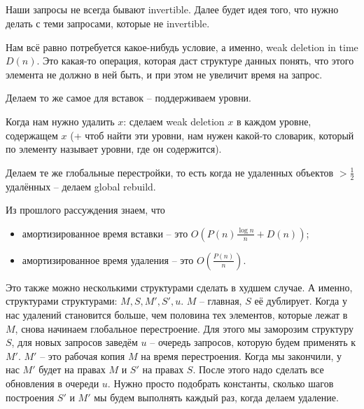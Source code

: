 \subsection{}

Наши запросы не всегда бывают invertible. Далее будет идея того, что нужно делать с теми запросами, которые не invertible.

Нам всё равно потребуется какое-нибудь условие, а именно, weak deletion in time $D(n)$. Это какая-то операция, которая даст структуре данных понять, что этого элемента не должно в ней быть, и при этом не увеличит время на запрос.

Делаем то же самое для вставок -- поддерживаем уровни.

Когда нам нужно удалить $x$: сделаем weak deletion $x$ в каждом уровне, содержащем $x$ (+ чтоб найти эти уровни, нам нужен какой-то словарик, который по элементу называет уровни, где он содержится).

Делаем те же глобальные перестройки, то есть когда не удаленных объектов $>\frac{1}{2}$ удалённых -- делаем global rebuild.

Из прошлого рассуждения знаем, что
\begin{itemize}
    \item амортизированное время вставки -- это $O\left(P(n)\frac{\log n}{n}+D(n)\right)$;
    \item амортизированное время удаления -- это $O\left(\frac{P(n)}{n}\right)$.
\end{itemize}

Это также можно несколькими структурами сделать в худшем случае. А именно, структурами структурами: $M,S,M',S',u$. $M$ -- главная, $S$ её дублирует. Когда у нас удалений становится больше, чем половина тех элементов, которые лежат в $M$, снова начинаем глобальное перестроение. Для этого мы заморозим структуру $S$, для новых запросов заведём $ u$ -- очередь запросов, которую будем применять к $M'$. $M'$ -- это рабочая копия $M$ на время перестроения. Когда мы закончили, у нас $M'$ будет на правах $M$ и $S'$ на правах $S$. После этого надо сделать все обновления в очереди $u$. Нужно просто подобрать константы, сколько шагов построения $S'$ и $M'$ мы будем выполнять каждый раз, когда делаем удаление.

